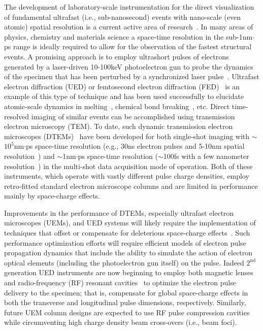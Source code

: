 The development of laboratory-scale instrumentation for the direct visualization of fundamental ultrafast (i.e., sub-nanosecond) events with nano-scale (even atomic) spatial resolution is a current active area of research~\cite{king_ultrafast_2005}.
In many areas of physics, chemistry and materials science a space-time resolution in the sub-1nm$\cdot$ps range is ideally required to allow for the observation of the fastest structural events.
A promising approach is to employ ultrashort pulses of electrons generated by a laser-driven 10-100keV photoelectron gun to probe the dynamics of the specimen that has been perturbed by a synchronized laser pulse~\cite{king_ultrafast_2005}.
Ultrafast electron diffraction (UED) or femtosecond electron diffraction (FED)~\cite{srinivasan_ultrafast_2003,williamson_clocking_1997,cao_femtosecond_2003} is an example of this type of technique and has been used successfully to elucidate atomic-scale dynamics in melting~\cite{cao_femtosecond_2003,sciaini_electronic_2009,siwick_atomic-level_2003}, chemical bond breaking~\cite{zewail_laser_1988}, etc.
Direct time-resolved imaging of similar events can be accomplished using transmission electron microscopy (TEM).
To date, such dynamic transmission electron microscopes (DTEMs)~\cite{bostanjoglo_tracing_1980,domer_high-speed_2003} have been developed for both single-shot imaging with $\sim$$10^{5}$nm$\cdot$ps space-time resolution (e.g., 30ns electron pulses and 5-10nm spatial resolution~\cite{lagrange_single-shot_2006,armstrong_practical_2007}) and $\sim$1nm$\cdot$ps space-time resolution ($\sim$100fs with a few nanometer resolution~\cite{park_direct_2009}) in the multi-shot data acquisition mode of operation.
Both of these instruments, which operate with vastly different pulse charge densities, employ retro-fitted standard electron microscope columns and are limited in performance mainly by space-charge effects.

Improvements in the performance of DTEMs, especially ultrafast electron microscopes (UEMs), and UED systems will likely require the implementation of techniques that offset or compensate for deleterious space-charge effects~\cite{armstrong_prospects_2007,lobastov_four-dimensional_2005}.
Such performance optimization efforts will require efficient models of electron pulse propagation dynamics that include the ability to simulate the action of electron optical elements (including the photoelectron gun itself) on the pulse.
Indeed $2^{\text{nd}}$ generation UED instruments are now beginning to employ both magnetic lenses and radio-frequency (RF) resonant cavities~\cite{oudheusden_electron_2007,veisz_hybrid_2007} to optimize the electron pulse delivery to the specimen; that is, compensate for global space-charge effects in both the transverse and longitudinal pulse dimensions, respectively.
Similarly, future UEM column designs are expected to use RF pulse compression cavities while circumventing high charge density beam cross-overs (i.e., beam foci).

